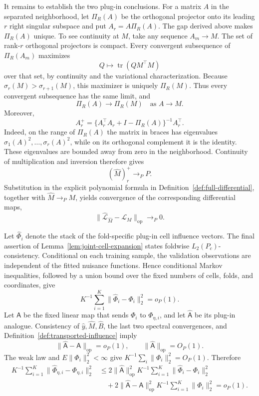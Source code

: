 It remains to establish the two plug-in conclusions. For a matrix \(A\) in the separated neighborhood, let \(\Pi_R(A)\) be the orthogonal projector onto its leading \(r\) right singular subspace and put \(A_r=A\Pi_R(A)\). The gap derived above makes \(\Pi_R(A)\) unique. To see continuity at \(M\), take any sequence \(A_m\to M\). The set of rank-\(r\) orthogonal projectors is compact. Every convergent subsequence of \(\Pi_R(A_m)\) maximizes
\[
 Q\longmapsto \operatorname{tr}(QM^\top M)
\]
over that set, by continuity and the variational characterization. Because \(\sigma_r(M)>\sigma_{r+1}(M)\), this maximizer is uniquely \(\Pi_R(M)\). Thus every convergent subsequence has the same limit, and
\[
 \Pi_R(A)\to\Pi_R(M)
 \quad\text{as }A\to M.
\]
Moreover,
\[
 A_r^+=\{A_r^\top A_r+I-\Pi_R(A)\}^{-1}A_r^\top.
\]
Indeed, on the range of \(\Pi_R(A)\) the matrix in braces has eigenvalues \(\sigma_1(A)^2,\ldots,\sigma_r(A)^2\), while on its orthogonal complement it is the identity. These eigenvalues are bounded away from zero in the neighborhood. Continuity of multiplication and inversion therefore gives
\[
 (\widehat M)_r^+\to_PP.
\]
Substitution in the explicit polynomial formula in Definition~\ref{def:full-differential}, together with \(\widehat M\to_PM\), yields convergence of the corresponding differential maps,
\[
 \|\widehat{\mathcal L}_{\widehat M}-\mathcal L_M\|_{\mathrm{op}}\to_P0.
\]

Let \(\widehat\Phi_i\) denote the stack of the fold-specific plug-in cell influence vectors. The final assertion of Lemma~\ref{lem:joint-cell-expansion} states foldwise \(L_2(P_c)\)-consistency. Conditional on each training sample, the validation observations are independent of the fitted nuisance functions. Hence conditional Markov inequalities, followed by a union bound over the fixed numbers of cells, folds, and coordinates, give
\[
 K^{-1}\sum_{i=1}^K\|\widehat\Phi_i-\Phi_i\|_2^2=o_P(1).
\]
Let \(\mathsf A\) be the fixed linear map that sends \(\Phi_i\) to \(\Phi_{\eta,i}\), and let \(\widehat{\mathsf A}\) be its plug-in analogue. Consistency of \(\widehat y,\widehat M,\widehat B\), the last two spectral convergences, and Definition~\ref{def:transported-influence} imply
\[
 \|\widehat{\mathsf A}-\mathsf A\|_{\mathrm{op}}=o_P(1),
 \qquad
 \|\widehat{\mathsf A}\|_{\mathrm{op}}=O_P(1).
\]
The weak law and \(E\|\Phi_i\|_2^2<\infty\) give \(K^{-1}\sum_i\|\Phi_i\|_2^2=O_P(1)\). Therefore
\[
\begin{aligned}
 K^{-1}\sum_{i=1}^K
 \|\widehat\Phi_{\eta,i}-\Phi_{\eta,i}\|_2^2
 &\le
 2\|\widehat{\mathsf A}\|_{\mathrm{op}}^2
 K^{-1}\sum_{i=1}^K\|\widehat\Phi_i-\Phi_i\|_2^2\\
 &\quad+
 2\|\widehat{\mathsf A}-\mathsf A\|_{\mathrm{op}}^2
 K^{-1}\sum_{i=1}^K\|\Phi_i\|_2^2
 =o_P(1).
\end{aligned}
\]

